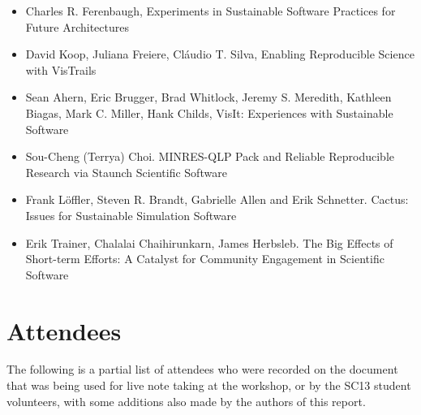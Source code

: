 \documentclass[11pt, oneside]{amsart}
\newcommand{\note}[1]{ {\textcolor{red}    { #1 }}}
\begin{document}
\begin{itemize}

\item Charles R. Ferenbaugh, Experiments in Sustainable Software
  Practices for Future Architectures~\cite{Ferenbaugh_WSSSPE}

\item David Koop, Juliana Freiere, Cl\'{a}udio T. Silva, Enabling
  Reproducible Science with VisTrails~\cite{Koop_WSSSPE}

\item Sean Ahern, Eric Brugger, Brad Whitlock, Jeremy S. Meredith,
  Kathleen Biagas, Mark C. Miller, Hank Childs, VisIt: Experiences
  with Sustainable Software~\cite{Ahern_WSSSPE}

\item Sou-Cheng (Terrya) Choi. MINRES-QLP Pack and Reliable
  Reproducible Research via Staunch Scientific Software~\cite{Choi_WSSSPE}

\item Frank L\"{o}ffler, Steven R. Brandt, Gabrielle Allen and Erik
  Schnetter. Cactus: Issues for Sustainable Simulation
  Software~\cite{Loffler_WSSSPE}

\item Erik Trainer, Chalalai Chaihirunkarn, James Herbsleb. The Big
  Effects of Short-term Efforts: A Catalyst for Community Engagement
  in Scientific Software~\cite{Trainer_WSSSPE}
  


\end{itemize}



\newpage

\section{Attendees} \label{sec:attendees}  %


The following is a partial list of attendees who were recorded on the
document~\cite{WSSSPE1-google-notes} that was being used for live note
taking at the workshop, or by the SC13 student volunteers, with some
additions also made by the authors of this report.
\end{document}
